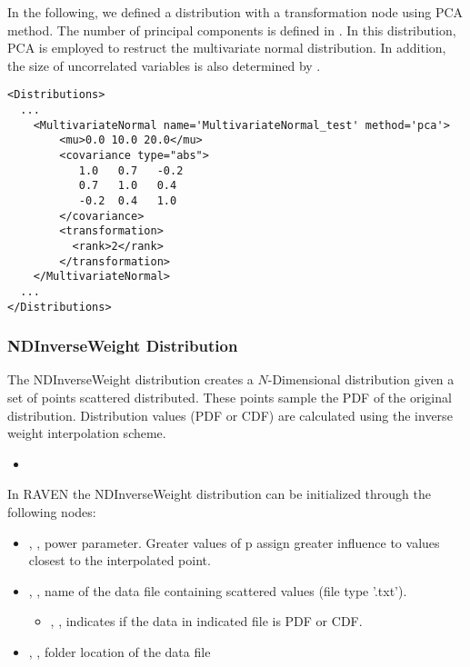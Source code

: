 In the following, we defined a distribution with a transformation node using PCA method. The number of principal components is 
defined in . In this distribution, PCA is employed to restruct the multivariate normal distribution. In addition, 
the size of uncorrelated variables is also determined by . 

\begin{lstlisting}[style=XML]
<Distributions>
  ...
    <MultivariateNormal name='MultivariateNormal_test' method='pca'>
        <mu>0.0 10.0 20.0</mu>
        <covariance type="abs">
           1.0   0.7   -0.2
           0.7   1.0   0.4
           -0.2  0.4   1.0
        </covariance>
        <transformation>
          <rank>2</rank>
        </transformation>
    </MultivariateNormal>
  ...
</Distributions>
\end{lstlisting}

\subsubsection{NDInverseWeight Distribution}
\label{NDInverseWeight}
The NDInverseWeight distribution creates a $N$-Dimensional distribution given a set of points
scattered distributed. These points sample the PDF of the original distribution.
Distribution values (PDF or CDF) are calculated using the inverse weight
interpolation scheme.

%
\attrsIntro
\vspace{-5mm}
\begin{itemize}
\itemsep0em
\item \nameDescription
\end{itemize}
\vspace{-5mm}


In RAVEN the NDInverseWeight distribution can be initialized through the following nodes:
\begin{itemize}
\item {}, , power parameter. Greater values of p assign greater influence to values closest to the interpolated point.
\item {}, ,  name of the data file containing scattered values (file type '.txt').
\begin{itemize}
\item {}, ,  indicates if the data in indicated file is PDF or CDF.
\end{itemize}
\item {}, , folder location of the data file
\end{itemize}

